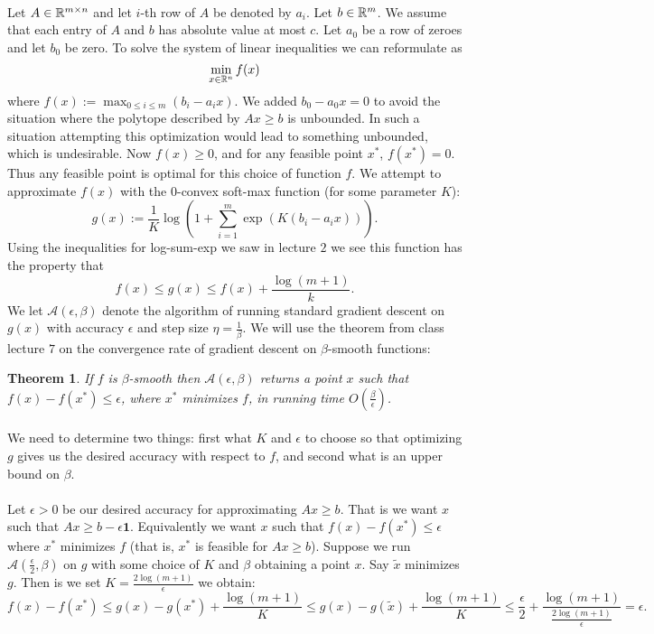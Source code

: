\documentclass[letterpaper,12pt,oneside,onecolumn]{article}
\newcommand{\cA}{\mathcal{A}} \newcommand{\cB}{\mathcal{B}}
\newtheorem{theorem}[fact]{Theorem}
\begin{document}
\paragraph{}
Let $A \in \mathbb{R}^{m\times n}$ and let $i$-th row of $A$ be denoted by $a_i$. Let $b \in \mathbb{R}^m$. We assume that each entry of $A$ and $b$ has absolute value at most $c$. Let $a_0$ be a row of zeroes and let $b_0$ be zero. To solve the system of linear inequalities we can reformulate as
$$\min_{x \in \mathbb{R}^n} f(x)$$
where $f(x) :=\max_{0 \leq i \leq m} (b_i - a_ix)$. We added $b_0 - a_0 x = 0$ to avoid the situation where the polytope described by $Ax \geq b$ is unbounded. In such a situation attempting this optimization would lead to something unbounded, which is undesirable. Now $f(x) \geq 0$, and for any feasible point $x^*$, $f(x^*) = 0$. Thus any feasible point is optimal for this choice of function $f$. We attempt to approximate $f(x)$ with the $0$-convex soft-max function (for some parameter $K$):
$$g(x) := \frac{1}{K}\log (1 + \sum_{i=1}^m \exp (K(b_i - a_i x))).$$
Using the inequalities for log-sum-exp we saw in lecture $2$ we see this function has the property that
$$f(x) \leq g(x) \leq f(x) + \frac{\log(m + 1)}{k}.$$
We let $\cA(\epsilon, \beta)$ denote the algorithm of running standard gradient descent on $g(x)$ with accuracy $\epsilon$ and step size $\eta = \frac{1}{\beta}$. We will use the theorem from class lecture $7$ on the convergence rate of gradient descent on $\beta$-smooth functions:
\begin{theorem}\label{th:gd}
If $f$ is $\beta$-smooth then $\cA(\epsilon, \beta)$ returns a point $x$ such that $f(x) -f(x^*) \leq \epsilon$, where $x^*$ minimizes $f$,  in running time $O(\frac{\beta}{\epsilon})$.
\end{theorem}
\paragraph{}
We need to determine two things: first what $K$ and $\epsilon$ to choose so that optimizing $g$ gives us the desired accuracy with respect to $f$, and second what is an upper bound on $\beta$.
\paragraph{}
Let $\epsilon >0$ be our desired accuracy for approximating $Ax \geq b$. That is we want $x$ such that $Ax \geq b - \epsilon \textbf{1}$. Equivalently we want $x$ such that $f(x) - f(x^*) \leq \epsilon$ where $x^*$ minimizes $f$ (that is, $x^*$ is feasible for $Ax \geq b$). Suppose we run $\cA(\frac{\epsilon}{2}, \beta)$ on $g$ with some choice of $K$ and $\beta$ obtaining a point $x$. Say $\tilde{x}$ minimizes $g$. Then is we set $K = \frac{2\log(m+1)}{\epsilon}$ we obtain:
$$f(x) -f(x^*) \leq g(x) -g(x^*) + \frac{\log(m+1)}{K} \leq g(x) - g(\tilde{x}) + \frac{\log(m+1)}{K} \leq \frac{\epsilon}{2} + \frac{\log(m+1)}{\frac{2\log(m+1)}{\epsilon}} = \epsilon.$$
\end{document}
